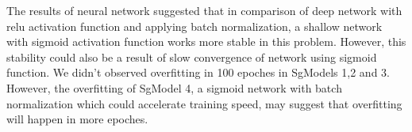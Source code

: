 \documentclass{article}
\begin{document}
The results of neural network suggested that in comparison of deep network with relu activation function and applying batch normalization, a shallow network with sigmoid activation function works more stable in this problem. However, this stability could also be a result of slow convergence of network using sigmoid function. We didn't observed overfitting in 100 epoches in SgModels 1,2 and 3. However, the overfitting of SgModel 4, a sigmoid network with batch normalization which could accelerate training speed, may suggest that overfitting will happen in more epoches.




\end{document}
